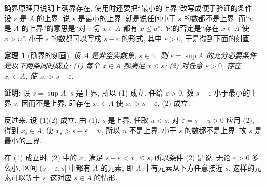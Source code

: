 \documentclass[UTF8,openany]{ctexbook}
\theoremstyle{chinesetextbook}
\newtheorem{theorem}{定理}[section]
\newenvironment{cnproof}{\par\indent\textbf{证明:} \ignorespaces}{\par}
\begin{document}
确界原理只说明上确界存在, 使用时还要把“最小的上界”改写成便于验证的条件. 设 $s$ 是 $A$ 的上界. 说 $s$ 是最小的上界, 就是说任何小于 $s$ 的数都不是上界. 而“$u$ 是 $A$ 的上界”的意思是“对一切 $x\in A$ 都有 $x\le u$”, 它的否定是“存在 $x\in A$ 使 $x>u$”. 小于 $s$ 的数都可以写成 $s-\varepsilon$ 的形式, 其中 $\varepsilon>0$, 于是得到下面的刻画.
\begin{theorem}[确界的刻画]
设 $A$ 是非空实数集, $s\in\mathbb R$. 则 $s=\sup A$ 的充分必要条件是以下两条同时成立: \textup{(1)} 每个 $x\in A$ 都满足 $x\le s$; \textup{(2)} 对任意 $\varepsilon>0$, 存在 $x_\varepsilon\in A$, 使 $x_\varepsilon>s-\varepsilon$.
\end{theorem}
\begin{cnproof}
设 $s=\sup A$. $s$ 是上界, 所以 (1) 成立. 任给 $\varepsilon>0$, 数 $s-\varepsilon$ 小于最小的上界 $s$, 因而不是上界, 即存在 $x_\varepsilon\in A$ 使 $x_\varepsilon>s-\varepsilon$, (2) 成立.

反过来, 设 (1)(2) 成立. 由 (1), $s$ 是上界. 任取 $u<s$, 对 $\varepsilon=s-u>0$ 应用 (2), 得到 $x_\varepsilon\in A$, 使 $x_\varepsilon>s-\varepsilon=u$, 所以 $u$ 不是上界. 小于 $s$ 的数都不是上界, 故 $s$ 是最小的上界.
\end{cnproof}
在 (1) 成立时, (2) 中的 $x_\varepsilon$ 满足 $s-\varepsilon<x_\varepsilon\le s$, 所以条件 (2) 是说, 无论 $\varepsilon>0$ 多么小, 区间 $(s-\varepsilon,s]$ 中都有 $A$ 的元素, 即 $A$ 中有元素从下方任意接近 $s$. 这样的元素可以等于 $s$, 这对应 $s\in A$ 的情形.
\end{document}
